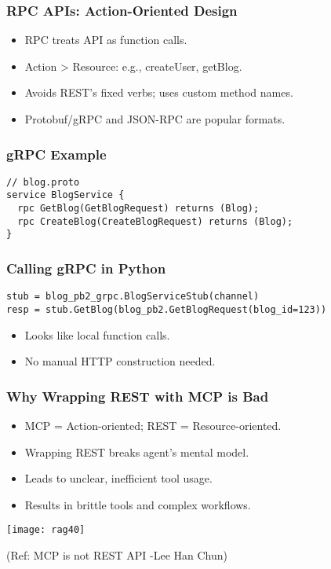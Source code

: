 \begin{frame}[fragile]\frametitle{RPC APIs: Action-Oriented Design}
\begin{itemize}
  \item RPC treats API as function calls.
  \item Action > Resource: e.g., createUser, getBlog.
  \item Avoids REST’s fixed verbs; uses custom method names.
  \item Protobuf/gRPC and JSON-RPC are popular formats.
\end{itemize}
\end{frame}

\begin{frame}[fragile]\frametitle{gRPC Example}
\begin{lstlisting}
// blog.proto
service BlogService {
  rpc GetBlog(GetBlogRequest) returns (Blog);
  rpc CreateBlog(CreateBlogRequest) returns (Blog);
}
\end{lstlisting}
\end{frame}

\begin{frame}[fragile]\frametitle{Calling gRPC in Python}
\begin{lstlisting}
stub = blog_pb2_grpc.BlogServiceStub(channel)
resp = stub.GetBlog(blog_pb2.GetBlogRequest(blog_id=123))
\end{lstlisting}
\begin{itemize}
  \item Looks like local function calls.
  \item No manual HTTP construction needed.
\end{itemize}
\end{frame}

\begin{frame}[fragile]\frametitle{Why Wrapping REST with MCP is Bad}
\begin{itemize}
  \item MCP = Action-oriented; REST = Resource-oriented.
  \item Wrapping REST breaks agent's mental model.
  \item Leads to unclear, inefficient tool usage.
  \item Results in brittle tools and complex workflows.
\end{itemize}

	\begin{center}
	\texttt{[image: rag40]}

	{\tiny (Ref: MCP is not REST API -Lee Han Chun)}
	\end{center}
\end{frame}

